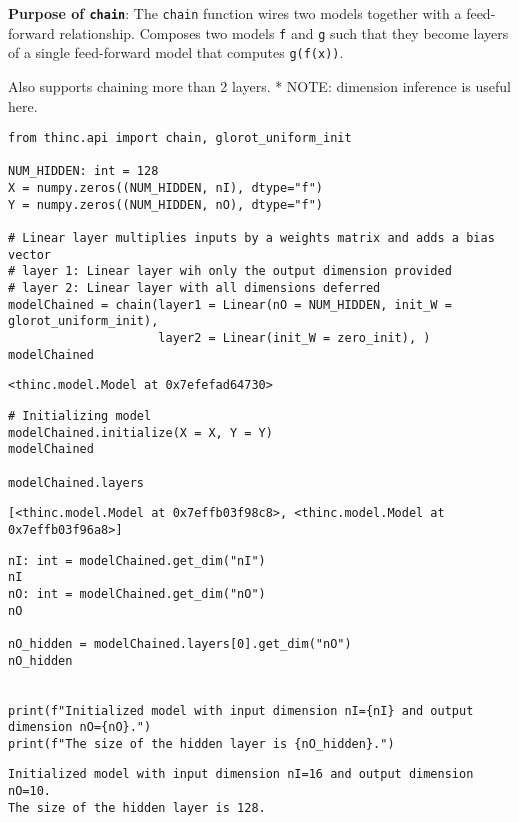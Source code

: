 \documentclass[
]{article}
\begin{document}
\textbf{Purpose of \texttt{chain}}: The
\texttt{chain} function wires two models together with a
feed-forward relationship. Composes two models \texttt{f}
and \texttt{g} such that they become layers of a single
feed-forward model that computes \texttt{g(f(x))}.

Also supports chaining more than 2 layers. * NOTE: dimension inference
is useful here.

\begin{verbatim}
from thinc.api import chain, glorot_uniform_init

NUM_HIDDEN: int = 128
X = numpy.zeros((NUM_HIDDEN, nI), dtype="f")
Y = numpy.zeros((NUM_HIDDEN, nO), dtype="f")

# Linear layer multiplies inputs by a weights matrix and adds a bias vector
# layer 1: Linear layer wih only the output dimension provided
# layer 2: Linear layer with all dimensions deferred
modelChained = chain(layer1 = Linear(nO = NUM_HIDDEN, init_W = glorot_uniform_init),
                     layer2 = Linear(init_W = zero_init), )
modelChained
\end{verbatim}

\begin{verbatim}
<thinc.model.Model at 0x7efefad64730>
\end{verbatim}

\begin{verbatim}
# Initializing model
modelChained.initialize(X = X, Y = Y)
modelChained

modelChained.layers
\end{verbatim}

\begin{verbatim}
[<thinc.model.Model at 0x7effb03f98c8>, <thinc.model.Model at 0x7effb03f96a8>]
\end{verbatim}

\begin{verbatim}
nI: int = modelChained.get_dim("nI")
nI
nO: int = modelChained.get_dim("nO")
nO

nO_hidden = modelChained.layers[0].get_dim("nO")
nO_hidden


print(f"Initialized model with input dimension nI={nI} and output dimension nO={nO}.")
print(f"The size of the hidden layer is {nO_hidden}.")
\end{verbatim}

\begin{verbatim}
Initialized model with input dimension nI=16 and output dimension nO=10.
The size of the hidden layer is 128.
\end{verbatim}
\end{document}

